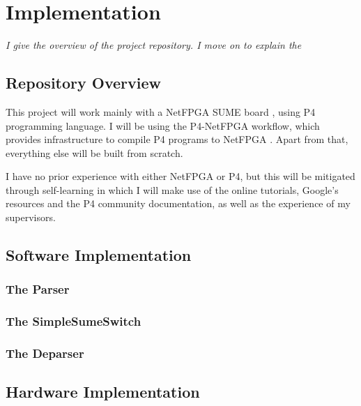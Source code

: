 \chapter{Implementation}
\textit{I give the overview of the project repository. I move on to explain the  }

\section{Repository Overview}



This project will work mainly with a NetFPGA SUME board \cite{zilberman2014netfpga}, using P4 programming language. I will be using the P4-NetFPGA workflow, which provides infrastructure to compile P4 programs to NetFPGA \cite{fpga}. Apart from that, everything else will be built from scratch.


I have no prior experience with either NetFPGA or P4, but this will be mitigated through self-learning in which I will make use of the online tutorials, Google's resources and the P4 community documentation, as well as the experience of my supervisors. 
\\

\section{Software Implementation}
	\subsection{The Parser}
	\subsection{The SimpleSumeSwitch}
	\subsection{The Deparser}

\section{Hardware Implementation}
	
